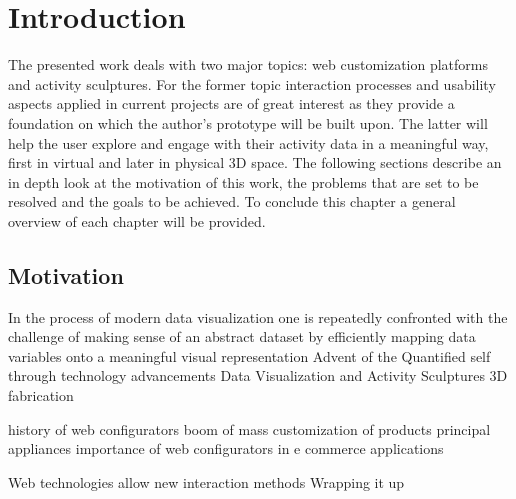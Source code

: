 \section{Introduction}
\label{ch:intro}
The presented work deals with two major topics: web customization platforms and
activity sculptures. For the former topic interaction processes and usability aspects
applied in current projects are of great interest as they provide a foundation on
which the author's prototype will be built upon. The latter will help the user
explore and engage with their activity data in a meaningful way, first in virtual and later in
physical 3D space. The following sections describe an in depth look at the
motivation of this work, the problems that are set to be resolved and the goals
to be achieved. To conclude this chapter a general overview of each chapter will be
provided. 

\subsection{Motivation}
In the process of modern data visualization one is repeatedly confronted with
the challenge of making sense of an abstract dataset by efficiently mapping data
variables onto a meaningful visual representation\cite{gee2005dynamic}
Advent of the Quantified self through technology advancements
Data Visualization and Activity Sculptures 
3D fabrication

history of web configurators
boom of mass customization of products
principal appliances
importance of web configurators in e commerce applications

Web technologies allow new interaction methods
Wrapping it up


